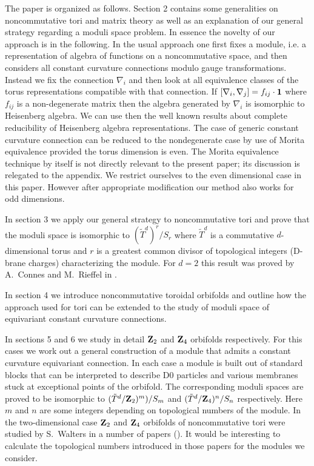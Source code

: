 \documentclass[a4paper,a4paper]{article}
\begin{document}
The paper is organized as follows. Section 2 contains some generalities on noncommutative tori 
and matrix theory as well as an explanation of our general strategy regarding a moduli space problem. 
In essence the novelty of our approach is in the following. In the usual approach one  first fixes a module, i.e. a 
representation of algebra of functions on a noncommutative space,  
and then considers all constant curvature connections modulo gauge transformations. Instead we fix the connection $\nabla_{i}$ and 
then look at all equivalence classes of the torus representations compatible with that connection. 
If $[\nabla_{i}, \nabla_{j}] = f_{ij}\cdot {\bf 1}$ where $f_{ij}$ is a non-degenerate matrix then the  algebra generated by 
$\nabla_{i}$ is isomorphic to Heisenberg algebra. We can use then the well known results about complete reducibility 
of Heisenberg algebra representations. The case of generic constant curvature connection can be reduced to the nondegenerate 
case by use of Morita equivalence provided the torus dimension is even. The  Morita equivalence technique by itself is not directly 
relevant to the present paper; its discussion is relegated to the appendix. 
We restrict ourselves to the even dimensional 
case in this paper. However after appropriate modification our method also works for odd dimensions.
 


In section 3 we apply our general strategy to noncommutative tori and prove that the moduli space 
is isomorphic to $(\tilde T^{d})^{r}/S_{r}$ where $\tilde T^{d}$ is a commutative $d$-dimensional torus and 
$r$ is a greatest common divisor of topological integers 
(D-brane charges) characterizing the module. For $d=2$ this result was proved by A.~Connes and M.~Rieffel in \cite{ConnesRieffel}.


In section 4 we introduce noncommutative toroidal orbifolds and  outline how the approach used for 
tori can be extended to the study of moduli space of equivariant constant curvature connections.


In sections 5 and 6 we study in detail ${\bf Z}_{2}$ and ${\bf Z}_{4}$ orbifolds respectively. 
For this cases we work out  a general construction of a module that admits a constant curvature equivariant connection.
In each case a module is built out of standard blocks that can be interpreted to describe D0 particles and 
various membranes stuck at exceptional points of the orbifold. The corresponding moduli spaces are proved to be 
isomorphic to $(\tilde T^{d}/{\bf Z}_{2})^{m})/S_{m}$ and  $(\tilde T^{d}/{\bf Z}_{4})^{n}/S_{n}$ respectively. 
Here $m$ and $n$ are some integers depending on  topological numbers of the module. 
In the two-dimensional case ${\bf Z}_{2}$ and ${\bf Z}_{4}$ orbifolds of  noncommutative tori were 
studied by S.~Walters in a number of papers (\cite{Walters}). It would be interesting to calculate the topological 
numbers introduced in those papers for the modules we consider.
  
\end{document}
